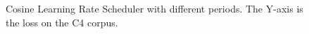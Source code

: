 \begin{figure}[htbp]
\begin{minipage}{0.46\linewidth}
        \caption{Cosine Learning Rate Scheduler with different periods. The Y-axis is the loss on the C4 corpus.}
        \label{fig:cosine_lr}
        \vspace{0.47cm}
    \end{minipage}
\end{figure}
\vspace{-5mm}